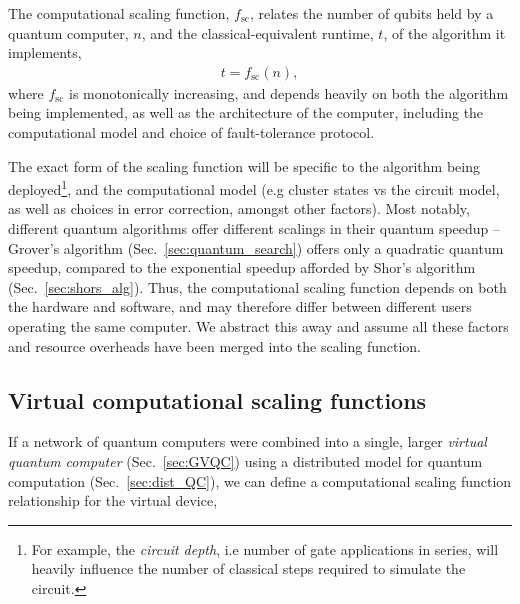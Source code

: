 \begin{definition} \label{def:scaling_func} 
The computational scaling function, $f_\mathrm{sc}$, relates the number of qubits held by a quantum computer, $n$, and the classical-equivalent runtime, $t$, of the algorithm it implements,
\begin{align}
t = f_\mathrm{sc}(n),
\end{align}
	where $f_\mathrm{sc}$ is monotonically increasing, and depends heavily on both the algorithm being implemented, as well as the architecture of the computer, including the computational model and choice of fault-tolerance protocol.
\end{definition}

The exact form of the scaling function will be specific to the algorithm being deployed\footnote{For example, the \textit{circuit depth}, i.e number of gate applications in series, will heavily influence the number of classical steps required to simulate the circuit.}, and the computational model (e.g cluster states vs the circuit model, as well as choices in error correction, amongst other factors). Most notably, different quantum algorithms offer different scalings in their quantum speedup -- Grover's algorithm (Sec.~\ref{sec:quantum_search}) offers only a quadratic quantum speedup, compared to the exponential speedup afforded by Shor's algorithm (Sec.~\ref{sec:shors_alg}). Thus, the computational scaling function depends on both the hardware and software, and may therefore differ between different users operating the same computer. We abstract this away and assume all these factors and resource overheads have been merged into the scaling function.

%
%

\subsection{Virtual computational scaling functions}

If a network of quantum computers were combined into a single, larger \textit{virtual quantum computer} (Sec.~\ref{sec:GVQC}) using a distributed model for quantum computation (Sec.~\ref{sec:dist_QC}), we can define a computational scaling function relationship for the virtual device,

